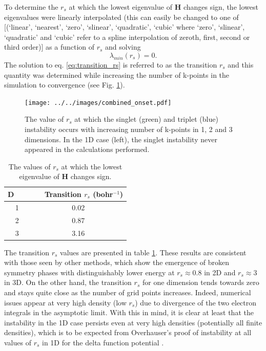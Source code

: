 \documentclass[preprint, journal=prl]{revtex4-1}
\begin{document}
  To determine the $r_s$ at which the lowest eigenvalue of $\mathbf{H}$ changes sign, the lowest eigenvalues were linearly interpolated  {\color{red} (this can easily be changed to one of [(‘linear’, ‘nearest’, ‘zero’, ‘slinear’, ‘quadratic’, ‘cubic’ where ‘zero’, ‘slinear’, ‘quadratic’ and ‘cubic’ refer to a spline interpolation of zeroth, first, second or third order)]} as a function of $r_s$ and solving
  \begin{equation} \label{eq:transition_rs}
    \lambda_{min}(r_s) = 0.
  \end{equation}
  The solution to eq. \ref{eq:transition_rs} is referred to as the transition $r_s$ and this quantity was determined while increasing the number of k-points in the simulation to convergence (see Fig. \ref{fig:onset}).
  \begin{figure}[H]
    \centering
    \texttt{[image: ../../images/combined\_onset.pdf]}
    \caption{The value of $r_s$ at which the singlet (green) and triplet (blue) instability    occurs with increasing number of k-points in 1, 2 and 3 dimensions. In the 1D case (left), the singlet instability never appeared in the calculations performed. }
    \label{fig:onset}
  \end{figure}
  
  
  \begin{table}[H]
  \centering
  \caption{The values of $r_s$ at which the lowest eigenvalue of $\mathbf{H}$ changes sign.}
    \begin{tabular}{ c | c }
      D~~~ & ~~ Transition $r_s$ (bohr$^{-1}$) \\
      \hline
      1    &  0.02 \\
      2    &  0.87 \\
      3    &  3.16 \\
      \hline
     \end{tabular}
  \label{table:transition_rs}
  \end{table}  
  The transition $r_s$ values are presented in table \ref{table:transition_rs}. These results are consistent with those seen by other methods, which show the emergence of broken symmetry phases with distinguishably lower energy at $r_s \approx 0.8$ in 2D and $r_s \approx 3$ in 3D\cite{Baguet2014, Bernu2011}. On the other hand, the transition $r_s$ for one dimension tends towards zero and stays quite close as the number of grid points increases. Indeed, numerical issues appear at very high density (low $r_s$) due to divergence of the two electron integrals in the asymptotic limit. With this in mind, it is clear at least that the instability in the 1D case persists even at very high densities (potentially all finite densities), which is to be expected from Overhauser's proof of instability at all values of $r_s$ in 1D for the delta function potential \cite{Overhauser1962}.
\end{document}
